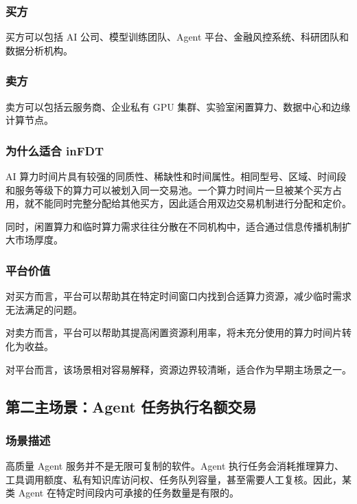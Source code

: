 \documentclass[UTF8,a4paper,12pt]{ctexart}
\begin{document}
\subsubsection*{买方}

买方可以包括 AI 公司、模型训练团队、Agent 平台、金融风控系统、科研团队和数据分析机构。

\subsubsection*{卖方}

卖方可以包括云服务商、企业私有 GPU 集群、实验室闲置算力、数据中心和边缘计算节点。

\subsubsection*{为什么适合 inFDT}

AI 算力时间片具有较强的同质性、稀缺性和时间属性。相同型号、区域、时间段和服务等级下的算力可以被划入同一交易池。一个算力时间片一旦被某个买方占用，就不能同时完整分配给其他买方，因此适合用双边交易机制进行分配和定价。

同时，闲置算力和临时算力需求往往分散在不同机构中，适合通过信息传播机制扩大市场厚度。

\subsubsection*{平台价值}

对买方而言，平台可以帮助其在特定时间窗口内找到合适算力资源，减少临时需求无法满足的问题。

对卖方而言，平台可以帮助其提高闲置资源利用率，将未充分使用的算力时间片转化为收益。

对平台而言，该场景相对容易解释，资源边界较清晰，适合作为早期主场景之一。

\subsection{第二主场景：Agent 任务执行名额交易}

\subsubsection*{场景描述}

高质量 Agent 服务并不是无限可复制的软件。Agent 执行任务会消耗推理算力、工具调用额度、私有知识库访问权、任务队列容量，甚至需要人工复核。因此，某类 Agent 在特定时间段内可承接的任务数量是有限的。
\end{document}

